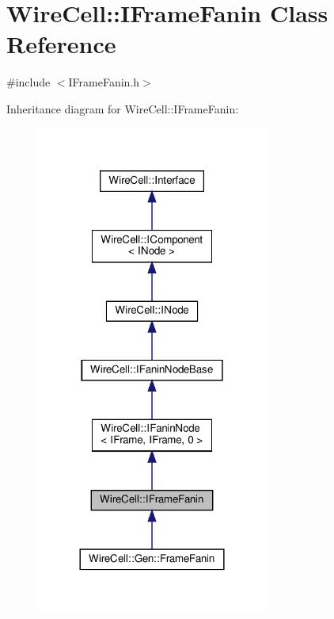 \hypertarget{class_wire_cell_1_1_i_frame_fanin}{}\section{Wire\+Cell\+:\+:I\+Frame\+Fanin Class Reference}
\label{class_wire_cell_1_1_i_frame_fanin}


{\ttfamily \#include $<$I\+Frame\+Fanin.\+h$>$}



Inheritance diagram for Wire\+Cell\+:\+:I\+Frame\+Fanin\+:
\nopagebreak
\begin{figure}[H]
\begin{center}
\leavevmode
\includegraphics[width=216pt]{class_wire_cell_1_1_i_frame_fanin__inherit__graph}
\end{center}
\end{figure}


